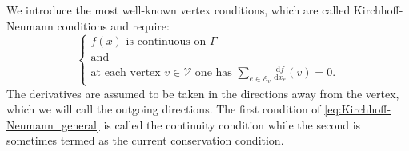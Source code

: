 We introduce the most well-known vertex conditions, which are called Kirchhoff-Neumann conditions and require: 
\begin{equation}
    \label{eq:Kirchhoff-Neumann_general}
    \begin{cases} 
        f(x) \text{ is continuous on } \Gamma \\ \text{and} \\  \text{at each vertex } v \in \mathcal{V} \text{ one has } \sum_{e \in \mathcal{E}_v} \frac{\mathrm{d} f}{\mathrm{d} x_e}(v) = 0.
    \end{cases}
\end{equation}
The derivatives are assumed to be taken in the directions away from the vertex, which we will call the outgoing directions. The first condition of \cref{eq:Kirchhoff-Neumann_general} is called the continuity condition while the second is sometimes termed as the current conservation condition.

